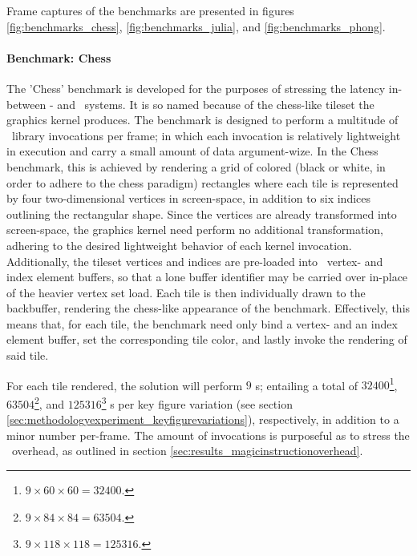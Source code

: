 Frame captures of the benchmarks are presented in figures \ref{fig:benchmarks_chess}, \ref{fig:benchmarks_julia}, and \ref{fig:benchmarks_phong}.




\paragraph{Benchmark: Chess}
\label{par:methodologyexperiment_benchmarking_benchmarkchess}
The 'Chess' benchmark is developed for the purposes of stressing the latency in-between \dvttermtarget - and \dvttermhost\ systems.
It is so named because of the chess-like tileset the graphics kernel produces.
The benchmark is designed to perform a multitude of \dvttermopenglestwopointo\ library invocations per frame; in which each invocation is relatively lightweight in execution and carry a small amount of data argument-wize.
In the Chess benchmark, this is achieved by rendering a grid of colored (black or white, in order to adhere to the chess paradigm) rectangles where each tile is represented by four two-dimensional vertices in screen-space, in addition to six indices outlining the rectangular shape.
Since the vertices are already transformed into screen-space, the graphics kernel need perform no additional transformation, adhering to the desired lightweight behavior of each kernel invocation.
Additionally, the tileset vertices and indices are pre-loaded into \dvttermopengl\ vertex- and index element buffers, so that a lone buffer identifier may be carried over in-place of the heavier vertex set load.
Each tile is then individually drawn to the backbuffer, rendering the chess-like appearance of the benchmark.
Effectively, this means that, for each tile, the benchmark need only bind a vertex- and an index element buffer, set the corresponding tile color, and lastly invoke the rendering of said tile.

For each tile rendered, the solution will perform $9$ \dvttermmagicinstruction s; entailing a total of $32400$\footnote{$9\times60\times60=32400$.}, $63504$\footnote{$9\times84\times84=63504$.}, and $125316$\footnote{$9\times118\times118=125316$.} \dvttermmagicinstruction s per key figure variation (see section \ref{sec:methodologyexperiment_keyfigurevariations}), respectively, in addition to a minor number  per-frame.
The amount of invocations is purposeful as to stress the \dvttermmagicinstruction\ overhead, as outlined in section \ref{sec:results_magicinstructionoverhead}.


